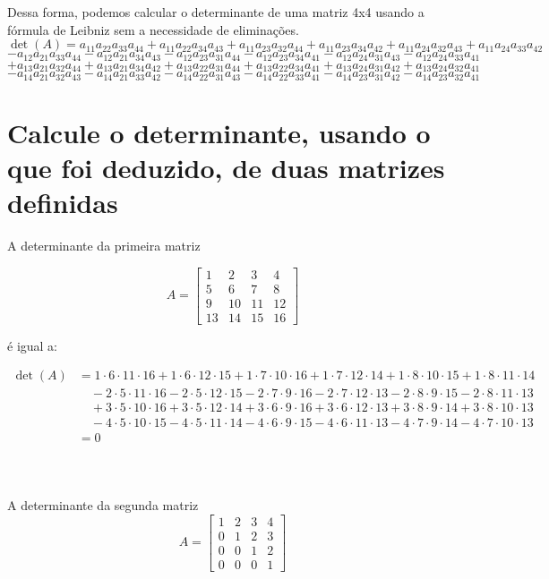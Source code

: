 \documentclass{article}
\begin{document}
Dessa forma, podemos calcular o determinante de uma matriz 4x4 usando a fórmula de Leibniz sem a necessidade de eliminações.
$$\det(A) = a_{11}a_{22}a_{33}a_{44} + a_{11}a_{22}a_{34}a_{43} + a_{11}a_{23}a_{32}a_{44} + a_{11}a_{23}a_{34}a_{42} + a_{11}a_{24}a_{32}a_{43} + a_{11}a_{24}a_{33}a_{42}$$
$$- a_{12}a_{21}a_{33}a_{44} - a_{12}a_{21}a_{34}a_{43} - a_{12}a_{23}a_{31}a_{44} - a_{12}a_{23}a_{34}a_{41} - a_{12}a_{24}a_{31}a_{43} - a_{12}a_{24}a_{33}a_{41}$$
$$+ a_{13}a_{21}a_{32}a_{44} + a_{13}a_{21}a_{34}a_{42} + a_{13}a_{22}a_{31}a_{44} + a_{13}a_{22}a_{34}a_{41} + a_{13}a_{24}a_{31}a_{42} + a_{13}a_{24}a_{32}a_{41}$$
$$- a_{14}a_{21}a_{32}a_{43} - a_{14}a_{21}a_{33}a_{42} - a_{14}a_{22}a_{31}a_{43} - a_{14}a_{22}a_{33}a_{41} - a_{14}a_{23}a_{31}a_{42} - a_{14}a_{23}a_{32}a_{41}$$

\section{Calcule o determinante, usando o que foi deduzido, de duas matrizes definidas}
A determinante da primeira matriz 

$$
A = \begin{bmatrix}
1 & 2 & 3 & 4 \\
5 & 6 & 7 & 8 \\
9 & 10 & 11 & 12 \\
13 & 14 & 15 & 16
\end{bmatrix}
$$

é igual a:

$$
\begin{aligned}
\det(A) &= 1\cdot6\cdot11\cdot16 + 1\cdot6\cdot12\cdot15 + 1\cdot7\cdot10\cdot16 + 1\cdot7\cdot12\cdot14 + 1\cdot8\cdot10\cdot15 + 1\cdot8\cdot11\cdot14 \\
&\quad - 2\cdot5\cdot11\cdot16 - 2\cdot5\cdot12\cdot15 - 2\cdot7\cdot9\cdot16 - 2\cdot7\cdot12\cdot13 - 2\cdot8\cdot9\cdot15 - 2\cdot8\cdot11\cdot13 \\
&\quad + 3\cdot5\cdot10\cdot16 + 3\cdot5\cdot12\cdot14 + 3\cdot6\cdot9\cdot16 + 3\cdot6\cdot12\cdot13 + 3\cdot8\cdot9\cdot14 + 3\cdot8\cdot10\cdot13 \\
&\quad - 4\cdot5\cdot10\cdot15 - 4\cdot5\cdot11\cdot14 - 4\cdot6\cdot9\cdot15 - 4\cdot6\cdot11\cdot13 - 4\cdot7\cdot9\cdot14 - 4\cdot7\cdot10\cdot13 \\
&= 0
\end{aligned}
$$
\\
\\
\\
A determinante da segunda matriz 
$$
A = \begin{bmatrix}
1 & 2 & 3 & 4 \\
0 & 1 & 2 & 3 \\
0 & 0 & 1 & 2 \\
0 & 0 & 0 & 1
\end{bmatrix}
$$
\end{document}
